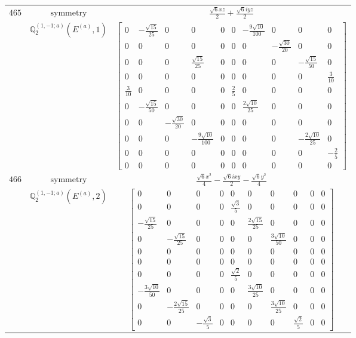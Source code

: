 \documentclass[fleqn,8pt,landscape]{jsarticle}
\begin{document}
\begin{longtable}{ccc}
$ 465 $ & $ \text{symmetry} $ & $ \frac{\sqrt{6} x z}{2} + \frac{\sqrt{6} i y z}{2} $ \\
$  $ & $ \mathbb{Q}_{2}^{(1,-1;a)}(E^{(a)},1) $ & $ \begin{bmatrix} 0 & - \frac{\sqrt{15}}{25} & 0 & 0 & 0 & 0 & - \frac{9 \sqrt{10}}{100} & 0 & 0 & 0 \\ 0 & 0 & 0 & 0 & 0 & 0 & 0 & - \frac{\sqrt{30}}{20} & 0 & 0 \\ 0 & 0 & 0 & \frac{\sqrt{15}}{25} & 0 & 0 & 0 & 0 & - \frac{\sqrt{15}}{50} & 0 \\ 0 & 0 & 0 & 0 & 0 & 0 & 0 & 0 & 0 & \frac{3}{10} \\ \frac{3}{10} & 0 & 0 & 0 & 0 & \frac{2}{5} & 0 & 0 & 0 & 0 \\ 0 & - \frac{\sqrt{15}}{50} & 0 & 0 & 0 & 0 & \frac{2 \sqrt{10}}{25} & 0 & 0 & 0 \\ 0 & 0 & - \frac{\sqrt{30}}{20} & 0 & 0 & 0 & 0 & 0 & 0 & 0 \\ 0 & 0 & 0 & - \frac{9 \sqrt{10}}{100} & 0 & 0 & 0 & 0 & - \frac{2 \sqrt{10}}{25} & 0 \\ 0 & 0 & 0 & 0 & 0 & 0 & 0 & 0 & 0 & - \frac{2}{5} \\ 0 & 0 & 0 & 0 & 0 & 0 & 0 & 0 & 0 & 0 \end{bmatrix} $ \\ \hline
$ 466 $ & $ \text{symmetry} $ & $ \frac{\sqrt{6} x^{2}}{4} - \frac{\sqrt{6} i x y}{2} - \frac{\sqrt{6} y^{2}}{4} $ \\
$  $ & $ \mathbb{Q}_{2}^{(1,-1;a)}(E^{(a)},2) $ & $ \begin{bmatrix} 0 & 0 & 0 & 0 & 0 & 0 & 0 & 0 & 0 & 0 \\ 0 & 0 & 0 & 0 & \frac{\sqrt{3}}{5} & 0 & 0 & 0 & 0 & 0 \\ - \frac{\sqrt{15}}{25} & 0 & 0 & 0 & 0 & \frac{2 \sqrt{15}}{25} & 0 & 0 & 0 & 0 \\ 0 & - \frac{\sqrt{15}}{25} & 0 & 0 & 0 & 0 & \frac{3 \sqrt{10}}{50} & 0 & 0 & 0 \\ 0 & 0 & 0 & 0 & 0 & 0 & 0 & 0 & 0 & 0 \\ 0 & 0 & 0 & 0 & 0 & 0 & 0 & 0 & 0 & 0 \\ 0 & 0 & 0 & 0 & \frac{\sqrt{2}}{5} & 0 & 0 & 0 & 0 & 0 \\ - \frac{3 \sqrt{10}}{50} & 0 & 0 & 0 & 0 & \frac{3 \sqrt{10}}{25} & 0 & 0 & 0 & 0 \\ 0 & - \frac{2 \sqrt{15}}{25} & 0 & 0 & 0 & 0 & \frac{3 \sqrt{10}}{25} & 0 & 0 & 0 \\ 0 & 0 & - \frac{\sqrt{3}}{5} & 0 & 0 & 0 & 0 & \frac{\sqrt{2}}{5} & 0 & 0 \end{bmatrix} $ \\ \hline

\end{longtable}
\end{document}
